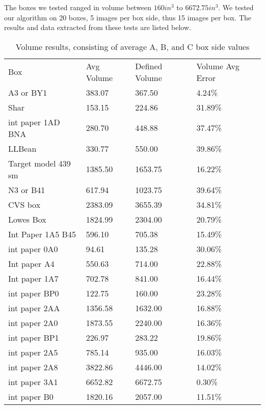 \documentclass[11pt, twoside, reqno]{book}
\begin{document}
The boxes we tested ranged in volume between $160 in^3$ to $6672.75 in^3$. We tested our algorithm on 20 boxes, 5 images per box side, thus 15 images per box. The results and data extracted from these tests are listed below. 
\FloatBarrier
\begin{table}[H]
	\centering

	\label{AR2E}
	\begin{tabular}{llll}
		Box                 & Avg Volume & Defined Volume & Volume Avg Error \\
		A3 or BY1           & 383.07     & 367.50         & 4.24\%           \\
		Shar                & 153.15     & 224.86         & 31.89\%          \\
		int paper 1AD BNA   & 280.70     & 448.88         & 37.47\%          \\
		LLBean              & 330.77     & 550.00         & 39.86\%          \\
		Target model 439 sm & 1385.50    & 1653.75        & 16.22\%          \\
		N3 or B41           & 617.94     & 1023.75        & 39.64\%          \\
		CVS box             & 2383.09    & 3655.39        & 34.81\%          \\
		Lowes Box           & 1824.99    & 2304.00        & 20.79\%          \\
		Int Paper 1A5 B45   & 596.10     & 705.38         & 15.49\%          \\
		int paper 0A0       & 94.61      & 135.28         & 30.06\%          \\
		Int paper A4        & 550.63     & 714.00         & 22.88\%          \\
		Int paper 1A7       & 702.78     & 841.00         & 16.44\%          \\
		int paper BP0       & 122.75     & 160.00         & 23.28\%          \\
		int paper 2AA       & 1356.58    & 1632.00        & 16.88\%          \\
		int paper 2A0       & 1873.55    & 2240.00        & 16.36\%          \\
		int paper BP1       & 226.97     & 283.22         & 19.86\%          \\
		int paper 2A5       & 785.14     & 935.00         & 16.03\%          \\
		int paper 2A8       & 3822.86    & 4446.00        & 14.02\%          \\
		int paper 3A1       & 6652.82    & 6672.75        & 0.30\%           \\
		int paper B0        & 1820.16    & 2057.00        & 11.51\%         
	\end{tabular}
\caption{Volume results, consisting of average A, B, and C box side values}
\end{table}
\FloatBarrier
\end{document}
